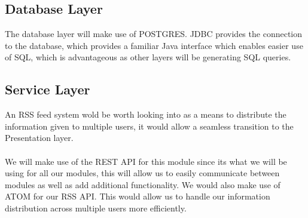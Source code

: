 \documentclass{article}
\begin{document}
		\subsection{Database Layer}
		The database layer will make use of POSTGRES. JDBC provides the connection to the database, which provides a familiar Java interface which enables easier use of SQL, which is advantageous as other layers will be generating SQL queries.
		
		\subsection{Service Layer}
		An RSS feed system wold be worth looking into as a means to distribute the information given to multiple users, it would allow a seamless transition to the Presentation layer.\\\\
		We will make use of the REST API for this module since its what we will be using for all our modules, this will allow us to easily communicate between modules as well as add additional functionality. We would also make use of ATOM for our RSS API. This would allow us to handle our information distribution across multiple users more efficiently.
			
\end{document}
